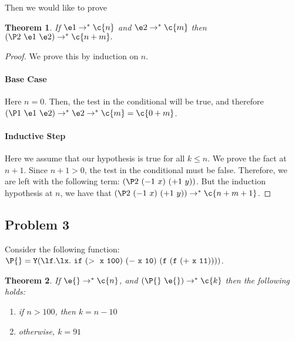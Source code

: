 \documentclass{article}[12pt]
\newtheorem{theorem}{Theorem}
\begin{document}
Then we would like to prove

\begin{theorem}
If $\e1 \rightarrow^* \c{n}$ and $\e2 \rightarrow^* \c{m}$ then $(\P2\
\e1\ \e2) \rightarrow^* \c{n+m}.$
\end{theorem}

\begin{proof}
  We prove this by induction on $n$.  

\paragraph{Base Case}  Here $n=0$.  Then, the test in the conditional
will be true, and therefore $(\P1\
\e1\ \e2) \rightarrow^* \e2 \rightarrow^* \c{m} = \c{0+m}$.

\paragraph{Inductive Step} Here we assume that our hypothesis is true
for all $k \leq n$.  We prove the fact at $n+1$.  Since $n+1 > 0$, the
test in the conditional must be false.  Therefore, we are left with
the following term: $(\P2\ (-1\ x)\ (+1\ y))$.  But the induction
hypothesis at $n$, we have that $(\P2\ (-1\ x)\ (+1\ y)) \rightarrow^*
\c{n+m+1}$.  

\end{proof}

\newcommand\red{\rightarrow^*} 
\newcommand\app[2]{(#1\ #2)}
\newcommand\PP[1]{\app{\P{}}{#1}}

\newpage

\subsection*{Problem 3}

Consider the following function: $\P{} = \mathtt{Y(\l f.\l x.\ if\ (>\
  x\ 100)\ (-\ x\ 10)\ (f\ (f\ (+\ x\ 11))))}$.

\begin{theorem}
   If $\e{} \red \c{n}$, and $\PP{\e{}} \red \c{k}$ then the following holds:
   \begin{enumerate}
   \item if $n > 100$, then $k = n-10$
   \item otherwise, $k = 91$ 
   \end{enumerate}


\end{theorem}
\end{document}
